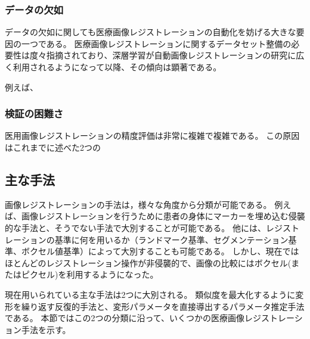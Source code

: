     \subsubsection{データの欠如}
        データの欠如に関しても医療画像レジストレーションの自動化を妨げる大きな要因の一つである。
        医療画像レジストレーションに関するデータセット整備の必要性は度々指摘されており、深層学習が自動画像レジストレーションの研究に広く利用されるようになって以降、その傾向は顕著である。
        
        例えば、
    
    \subsubsection{検証の困難さ}
        医用画像レジストレーションの精度評価は非常に複雑で複雑である。
        この原因はこれまでに述べた2つの

\subsection{主な手法}
    画像レジストレーションの手法は，様々な角度から分類が可能である\cite{maintz1998survey}。
    例えば、画像レジストレーションを行うために患者の身体にマーカーを埋め込む侵襲的な手法\cite{lunsford2012modern, van1995automatic}と、そうでない手法で大別することが可能である。
    他には、レジストレーションの基準に何を用いるか（ランドマーク基準\cite{evans1996correlative, uenohara1995vision}、セグメンテーション基準\cite{zhao1993registration, andersson1995method}、ボクセル値基準）によって大別することも可能である。
    しかし、現在ではほとんどのレジストレーション操作が非侵襲的で、画像の比較にはボクセル(またはピクセル)を利用するようになった。

    現在用いられている主な手法は2つに大別される。
    類似度を最大化するように変形を繰り返す反復的手法と、変形パラメータを直接導出するパラメータ推定手法である。
    本節ではこの2つの分類に沿って、いくつかの医療画像レジストレーション手法を示す。
    
